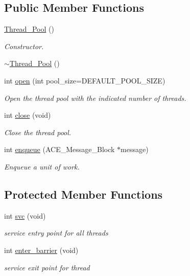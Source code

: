\subsection*{Public Member Functions}
\begin{DoxyCompactItemize}
\item 
\hyperlink{classMadara_1_1Thread__Pool_a4e4efa340eb3b538ea7133d0f9a9f8f7}{Thread\_\-Pool} ()
\begin{DoxyCompactList}\small\item\em Constructor. \item\end{DoxyCompactList}\item 
\hyperlink{classMadara_1_1Thread__Pool_ad1448764c7945dda5ef7e18170efbc92}{$\sim$Thread\_\-Pool} ()
\item 
int \hyperlink{classMadara_1_1Thread__Pool_a26bfa147cbce5b51fc5084d1f7e8dc28}{open} (int pool\_\-size=DEFAULT\_\-POOL\_\-SIZE)
\begin{DoxyCompactList}\small\item\em Open the thread pool with the indicated number of threads. \item\end{DoxyCompactList}\item 
int \hyperlink{classMadara_1_1Thread__Pool_a16dc4f1bf77b224b396e6d739195eb22}{close} (void)
\begin{DoxyCompactList}\small\item\em Close the thread pool. \item\end{DoxyCompactList}\item 
int \hyperlink{classMadara_1_1Thread__Pool_a73492d06d61080eb597485cabd04cb80}{enqueue} (ACE\_\-Message\_\-Block $\ast$message)
\begin{DoxyCompactList}\small\item\em Enqueue a unit of work. \item\end{DoxyCompactList}\end{DoxyCompactItemize}
\subsection*{Protected Member Functions}
\begin{DoxyCompactItemize}
\item 
int \hyperlink{classMadara_1_1Thread__Pool_adce10a858e798fe062afdc758f5979df}{svc} (void)
\begin{DoxyCompactList}\small\item\em service entry point for all threads \item\end{DoxyCompactList}\item 
int \hyperlink{classMadara_1_1Thread__Pool_ab9561aafc19da0cab5bfb05c37836160}{enter\_\-barrier} (void)
\begin{DoxyCompactList}\small\item\em service exit point for thread \item\end{DoxyCompactList}\end{DoxyCompactItemize}
